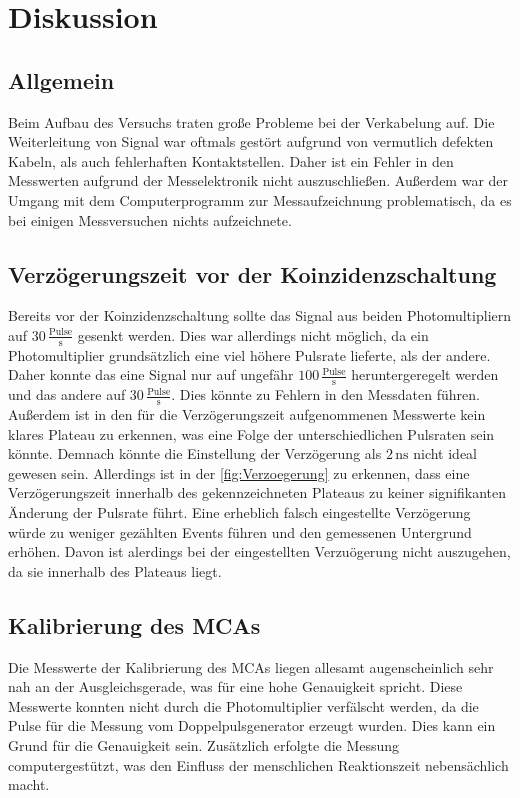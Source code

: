 \section{Diskussion}
\label{sec:Diskussion}
\subsection{Allgemein}
Beim Aufbau des Versuchs traten große Probleme bei der Verkabelung auf. Die Weiterleitung von Signal war oftmals gestört aufgrund von vermutlich defekten Kabeln, als auch fehlerhaften Kontaktstellen. 
Daher ist ein Fehler in den Messwerten aufgrund der Messelektronik nicht auszuschließen. Außerdem war 
der Umgang mit dem Computerprogramm zur Messaufzeichnung problematisch, da es bei einigen Messversuchen nichts aufzeichnete. 

\subsection{Verzögerungszeit vor der Koinzidenzschaltung}
Bereits vor der Koinzidenzschaltung sollte das Signal aus beiden Photomultipliern auf $30 \,\frac{\text{Pulse}}{\unit{\second}}$ gesenkt 
werden. Dies war allerdings nicht möglich, da ein Photomultiplier grundsätzlich eine viel höhere Pulsrate lieferte, als der andere. 
Daher konnte das eine Signal nur auf ungefähr $100 \,\frac{\text{Pulse}}{\unit{\second}}$ heruntergeregelt werden und das andere 
auf $30 \,\frac{\text{Pulse}}{\unit{\second}}$. 
Dies könnte zu Fehlern in den Messdaten führen. 
Außerdem ist in den für die
Verzögerungszeit aufgenommenen Messwerte kein klares Plateau zu erkennen, was eine Folge der unterschiedlichen Pulsraten sein könnte. 
Demnach könnte die Einstellung der Verzögerung als $2 \, \unit{\nano\second}$ nicht ideal gewesen sein. Allerdings ist in 
der \autoref{fig:Verzoegerung} zu erkennen, dass eine Verzögerungszeit innerhalb des gekennzeichneten Plateaus zu keiner signifikanten
Änderung der Pulsrate führt. Eine erheblich falsch eingestellte Verzögerung würde zu weniger gezählten Events führen und den gemessenen Untergrund erhöhen. Davon ist alerdings bei der eingestellten Verzuögerung nicht auszugehen, da sie innerhalb des Plateaus liegt. 

\subsection{Kalibrierung des MCAs}
Die Messwerte der Kalibrierung des MCAs liegen allesamt augenscheinlich sehr nah an der Ausgleichsgerade, was für eine hohe 
Genauigkeit spricht. 
Diese Messwerte konnten nicht durch die Photomultiplier verfälscht werden, da die Pulse für die Messung vom Doppelpulsgenerator erzeugt wurden. 
Dies kann ein Grund für die Genauigkeit sein.
Zusätzlich erfolgte die Messung computergestützt, was den Einfluss der menschlichen Reaktionszeit nebensächlich macht. 

